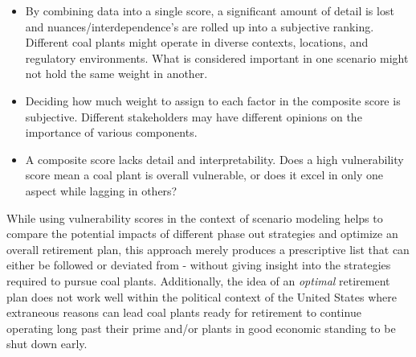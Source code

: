 \begin{itemize}
    \item By combining data into a single score, a significant amount of detail is lost and nuances/interdependence's are rolled up into a subjective ranking. Different coal plants might operate in diverse contexts, locations, and regulatory environments. What is considered important in one scenario might not hold the same weight in another.
    \item Deciding how much weight to assign to each factor in the composite score is subjective. Different stakeholders may have different opinions on the importance of various components.
    \item A composite score lacks detail and interpretability. Does a high vulnerability score mean a coal plant is overall vulnerable, or does it excel in only one aspect while lagging in others?
\end{itemize}

While using vulnerability scores in the context of scenario modeling helps to compare the potential impacts of different phase out strategies and optimize an overall retirement plan, this approach merely produces a prescriptive list that can either be followed or deviated from - without giving insight into the strategies required to pursue coal plants. Additionally, the idea of an \textit{optimal} retirement plan does not work well within the political context of the United States where extraneous reasons can lead coal plants ready for retirement to continue operating long past their prime and/or plants in good economic standing to be shut down early. 